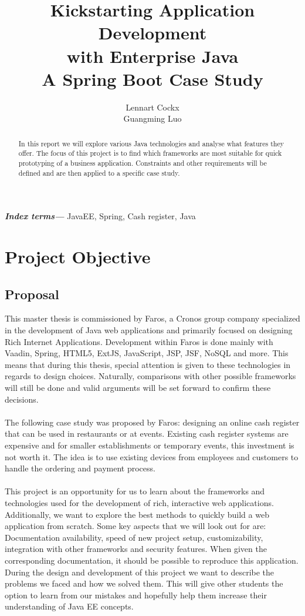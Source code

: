 \documentclass[12pt]{article}
\title{Kickstarting Application Development\\ with Enterprise Java\\ A Spring Boot Case Study}
\author{Lennart Cockx\\Guangming Luo}
\providecommand{\keywords}[1]{\textbf{\textit{Index terms---}} #1}
\begin{document}
\maketitle
\newpage
\tableofcontents
\newpage

\begin{abstract}
\noindent In this report we will explore various Java technologies and analyse what features they offer. The focus of this project is to find which frameworks are most suitable for quick prototyping of a business application.
Constraints and other requirements will be defined and are then applied to a specific case study.
\end{abstract}
\keywords{JavaEE, Spring, Cash register, Java}

\section{Project Objective}
\subsection{Proposal}
This master thesis is commissioned by Faros, a Cronos group company specialized in the development of Java web applications and primarily focused on designing Rich Internet Applications. Development within Faros is done mainly with Vaadin, Spring, HTML5, ExtJS, JavaScript, JSP, JSF, NoSQL and more. This means that during this thesis, special attention is given to these technologies in regards to design choices. Naturally, comparisons with other possible frameworks will still be done and valid arguments will be set forward to confirm these decisions.
\\\\
The following case study was proposed by Faros: designing an online cash register that can be used in restaurants or at events. Existing cash register systems are expensive and for smaller establishments or temporary events, this investment is not worth it. The idea is to use existing devices from employees and customers to handle the ordering and payment process.
\\\\
This project is an opportunity for us to learn about the frameworks and technologies used for the development of rich, interactive web applications. Additionally, we want to explore the best methods to quickly build a web application from scratch. Some key aspects that we will look out for are: Documentation availability, speed of new project setup, customizability, integration with other frameworks and security features. When given the corresponding documentation, it should be possible to reproduce this application. During the design and development of this project we want to describe the problems we faced and how we solved them. This will give other students the option to learn from our mistakes and hopefully help them increase their understanding of Java EE concepts. 
\end{document}
